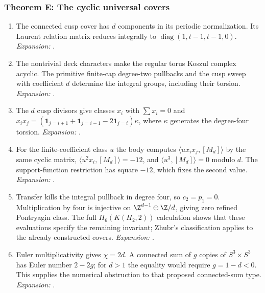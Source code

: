 \subsubsection*{Theorem E: The cyclic universal covers}
\begin{enumerate}[label=\arabic*.,leftmargin=*]
\item\hypertarget{step-III-E-1}{} The connected cusp cover has $d$ components in its periodic
normalization.  Its Laurent relation matrix reduces integrally
to $\operatorname{diag}(1,t-1,t-1,0)$.
\textit{Expansion:} .
\item\hypertarget{step-III-E-2}{} The nontrivial deck characters make the regular torus Koszul
complex acyclic.  The primitive finite-cap degree-two pullbacks
and the cusp sweep with coefficient $d$ determine the integral
groups, including their torsion.
\textit{Expansion:} .
\item\hypertarget{step-III-E-3}{} The $d$ cusp divisors give classes $x_i$ with
$\sum x_i=0$ and
$x_ix_j=(\mathbf1_{j=i+1}+\mathbf1_{j=i-1}-2\mathbf1_{j=i})\kappa$,
where $\kappa$ generates the degree-four torsion.
\textit{Expansion:} .
\item\hypertarget{step-III-E-4}{} For the finite-coefficient class $u$ the body computes
$\langle ux_ix_j,[M_d]\rangle$ by the same cyclic matrix,
$\langle u^2x_i,[M_d]\rangle=-12$, and
$\langle u^3,[M_d]\rangle=0$ modulo $d$.  The support-function
restriction has square $-12$, which fixes the second value.
\textit{Expansion:} .
\item\hypertarget{step-III-E-5}{} Transfer kills the integral pullback in degree four, so
$c_2=p_1=0$.  Multiplication by four is injective on
$\Z^{d-1}\oplus\Z/d$, giving zero refined Pontryagin class.
The full $H_6(K(H_2,2))$ calculation shows that these evaluations
specify the remaining invariant; Zhubr's classification applies
to the already constructed covers.
\textit{Expansion:} .
\item\hypertarget{step-III-E-6}{} Euler multiplicativity gives $\chi=2d$.  A connected sum of
$g$ copies of $S^3\times S^3$ has Euler number $2-2g$; for
$d>1$ the equality would require $g=1-d<0$.  This supplies the
numerical obstruction to that proposed connected-sum type.
\textit{Expansion:} .
\end{enumerate}

\hypertarget{outline-III-F}{}
